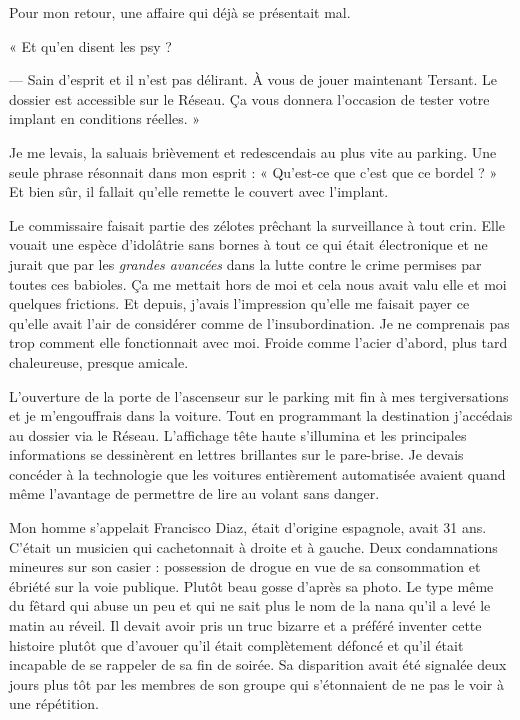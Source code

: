 Pour mon retour, une affaire qui déjà se présentait mal.

« Et qu'en disent les psy ?

— Sain d'esprit et il n'est pas délirant. À vous de jouer maintenant Tersant. Le dossier est accessible sur le
Réseau. Ça vous donnera l'occasion de tester votre implant en conditions réelles. »

Je me levais, la saluais brièvement et redescendais au plus vite au parking. Une seule phrase résonnait dans mon
esprit : « Qu'est-ce que c'est que ce bordel ? » Et bien sûr, il fallait qu'elle remette le couvert avec l'implant.

Le commissaire faisait partie des zélotes prêchant la surveillance à tout crin. Elle vouait une espèce d'idolâtrie sans
bornes à tout ce qui était électronique et ne jurait que par les \emph{grandes avancées} dans la lutte contre le crime
permises par toutes ces babioles. Ça me mettait hors de moi et cela nous avait valu elle et moi quelques frictions. Et
depuis, j'avais l'impression qu'elle me faisait payer ce qu'elle avait l'air de considérer comme de l'insubordination. 
Je ne comprenais pas trop comment elle fonctionnait avec moi. Froide comme l'acier d'abord, plus tard chaleureuse, 
presque amicale.

L'ouverture de la porte de l'ascenseur sur le parking mit fin à mes tergiversations et je m'engouffrais dans la
voiture. Tout en programmant la destination j'accédais au dossier via le Réseau. L'affichage tête haute s'illumina et 
les principales informations se dessinèrent en lettres brillantes sur le pare-brise. Je devais concéder à la technologie
que les voitures entièrement automatisée avaient quand même l'avantage de permettre de lire au volant sans danger.

Mon homme s'appelait Francisco Diaz, était d'origine espagnole, avait 31 ans. C'était un musicien qui cachetonnait à
droite et à gauche. Deux condamnations mineures sur son casier : possession de drogue en vue de sa consommation et
ébriété sur la voie publique. Plutôt beau gosse d'après sa photo. Le type même du fêtard qui abuse un peu et qui ne sait
plus le nom de la nana qu'il a levé le matin au réveil. Il devait avoir pris un truc bizarre et a préféré inventer cette
histoire plutôt que d'avouer qu'il était complètement défoncé et qu'il était incapable de se rappeler de sa fin de 
soirée. Sa disparition avait été signalée deux jours plus tôt par les membres de son groupe qui s'étonnaient de ne pas 
le voir à une répétition.

